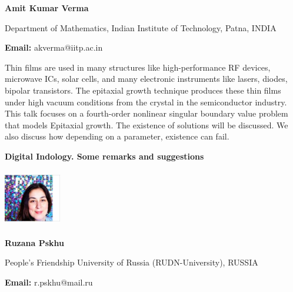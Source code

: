 \documentclass[twoside,11pt]{amsart}
\begin{document}
\centerline{\textbf{Amit Kumar Verma }}
\vskip 2mm
\begin{flushleft}
Department of Mathematics, Indian Institute of Technology, Patna, INDIA
\end{flushleft}
\vskip 2mm
\begin{flushleft}
{\bf Email:} akverma@iitp.ac.in
\end{flushleft}

\vskip 8mm
Thin films are used in many structures like high-performance RF devices, microwave ICs, solar cells, and many electronic instruments like lasers, diodes, bipolar transistors. The epitaxial growth technique produces these thin films under high vacuum conditions from the crystal in the semiconductor industry. This talk focuses on a fourth-order nonlinear singular boundary value problem that models Epitaxial growth. The existence of solutions will be discussed. We also discuss how depending on a parameter, existence can fail.
\newpage


\vskip 10mm
\begin{center}\bf\LARGE
Digital Indology. Some remarks and suggestions
\end{center}
\vskip 5mm
\begin{center}
\includegraphics[width=2.5cm, height=2.5cm, keepaspectratio=false]{RP2.jpg}
\end{center}
\vskip 2mm

\centerline{\textbf{  Ruzana Pskhu  }}
\vskip 2mm
\begin{flushleft}
People's Friendship University of Russia (RUDN-University), RUSSIA
\end{flushleft}
\vskip 2mm
\begin{flushleft}
{\bf Email:}  r.pskhu@mail.ru
\end{flushleft}
\end{document}
